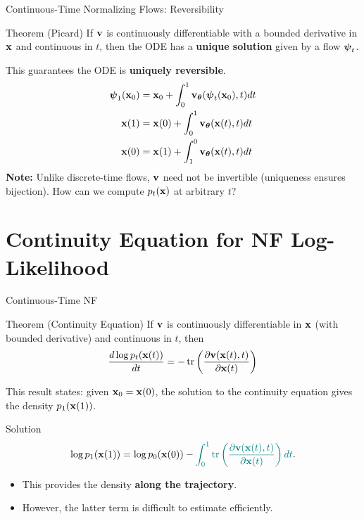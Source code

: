 \documentclass{beamer}
\begin{document}
\begin{frame}{Continuous-Time Normalizing Flows: Reversibility}
	\begin{block}{Theorem (Picard)}
		If $\mathbf{v}$ is continuously differentiable with a bounded derivative in $\mathbf{x}$ and continuous in $t$, then the ODE has a \textbf{unique solution} given by a flow $\boldsymbol{\psi}_t$.
	\end{block}
	\eqpause
	This guarantees the ODE is \textbf{uniquely reversible}. 
	\vspace{-0.3cm}
	\begin{align*}
		\boldsymbol{\psi}_1(\mathbf{x}_0) &= \mathbf{x}_0 + \int_{0}^{1} \mathbf{v}_{\boldsymbol{\theta}}(\boldsymbol{\psi}_t(\mathbf{x}_0), t) dt \\
		\mathbf{x}(1) &= \mathbf{x}(0) + \int_{0}^{1} \mathbf{v}_{\boldsymbol{\theta}}(\mathbf{x}(t), t) dt \\
		\mathbf{x}(0) &= \mathbf{x}(1) + \int_{1}^{0} \mathbf{v}_{\boldsymbol{\theta}}(\mathbf{x}(t), t) dt
	\end{align*}
	\eqpause
	\textbf{Note:} Unlike discrete-time flows, $\mathbf{v}$ need not be invertible (uniqueness ensures bijection).
	\eqpause
	How can we compute $p_t(\mathbf{x})$ at arbitrary $t$?
\end{frame}
\section{Continuity Equation for NF Log-Likelihood}
\begin{frame}{Continuous-Time NF}
	\begin{block}{Theorem (Continuity Equation)}
		If $\mathbf{v}$ is continuously differentiable in $\mathbf{x}$ (with bounded derivative) and continuous in $t$, then
		\[
			\frac{d \log p_t(\mathbf{x}(t))}{d t} = - \operatorname{tr} \left( \frac{\partial \mathbf{v}(\mathbf{x}(t), t)}{\partial \mathbf{x}(t)} \right)
		\]
		\vspace{-0.3cm}
	\end{block}
	\eqpause
	This result states: given $\mathbf{x}_0 = \mathbf{x}(0)$, the solution to the continuity equation gives the density $p_1(\mathbf{x}(1))$.
	\begin{block}{Solution}
		\vspace{-0.3cm}
		\[
			\log p_1(\mathbf{x}(1)) = \log p_0(\mathbf{x}(0)) - {\color{teal}\int_{0}^{1} \operatorname{tr}  \left( \frac{\partial \mathbf{v}(\mathbf{x}(t), t)}{\partial \mathbf{x}(t)} \right) dt}.
		\]
		\vspace{-0.3cm}
	\end{block}
	\eqpause
	\begin{itemize}
		\item This provides the density \textbf{along the trajectory}.
		\item However, {\color{teal}the latter term} is difficult to estimate efficiently.
	\end{itemize}
\end{frame}
\end{document}
